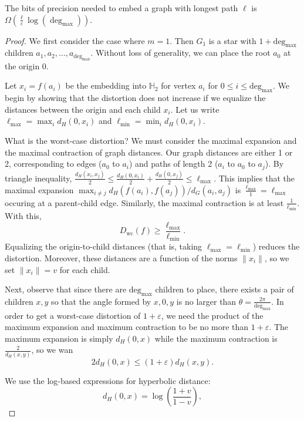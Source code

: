 \begin{lemma}
The bits of precision needed to embed a graph with longest path $\ell$ is $\Omega\left(\frac{\ell}{\varepsilon} \log(\operatorname{deg}_{\max}) \right)$.
\end{lemma}
\begin{proof}



We first consider the case where $m=1$. Then $G_1$ is a star with $1+\text{deg}_{\max}$ children $a_1, a_2, \ldots, a_{\text{deg}_{\max}}$. Without loss of generality, we can place the root $a_0$ at the origin $0$. 

Let $x_i = f(a_i)$ be the embedding into $\mathbb{H}_2$ for vertex $a_i$ for $0 \leq i \leq \text{deg}_{\max}$.
We begin by showing that the distortion does not increase if we equalize the distances between the origin and each child $x_i$.
Let us write $\ell_{\max} = \max_i d_H(0,x_i) $ and $\ell_{\min} = \min_i  d_H(0,x_i)$. 

What is the worst-case distortion? We must consider the maximal expansion and the maximal contraction of graph distances.
Our graph distances are either 1 or 2, corresponding to edges ($a_0$ to $a_i$) and paths of length 2 ($a_i$ to $a_0$ to $a_j$).
By triangle inequality, $\frac{d_H(x_i,x_j)}{2} \leq \frac{d_H(0, x_i)}{2}+ \frac{d_H(0, x_j)}{2} \leq \ell_{\max}$.
This implies that the maximal expansion $\max_{i \neq j} d_H(f(a_i),f(a_j))/d_G(a_i,a_j)$ is $\frac{\ell_{\max}}{1} = \ell_{\max}$ occuring at a parent-child edge.
Similarly, the maximal contraction is at least $\frac{1}{\ell_{\min}}$. With this,
\[D_{\text{wc}}(f) \geq \frac{\ell_{\max}}{\ell_{\min}}.\]
Equalizing the origin-to-child distances (that is, taking $\ell_{\max} = \ell_{\min}$) reduces the distortion. Moreover, these distances are a function of the norms $\|x_i\|$, so we set $\|x_i\| = v$ for each child. 

Next, observe that since there are $\text{deg}_{\max}$ children to place, there exists a pair of children $x,y$ so that the angle formed by $x,0,y$ is no larger than $\theta = \frac{2\pi}{\text{deg}_{\max}}$. In order to get a worst-case distortion of $1+\varepsilon$, we need the product of the maximum expansion and maximum contraction to be no more than $1+\varepsilon$. The maximum expansion is simply $d_H(0,x)$ while the maximum contraction is $\frac{2}{d_H(x,y)}$, so we wan
\[2d_H(0,x) \leq (1+\varepsilon) d_H(x,y).\]

We use the log-based expressions for hyperbolic distance:
\[d_H(0,x) = \log \left(\frac{1+v}{1-v} \right),\]


\end{proof}

